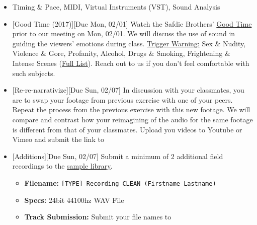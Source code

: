 \def\dMon{Mon, 02/01}
\def\dTues{Tues, 02/02}
\def\dWed{Wed, 02/03}
\def\dThur{Thur, 02/04}
\def\dFri{Fri, 02/05}
\def\dSat{Sat, 02/06}
\def\dSun{Sun, 02/07}
\placeDate


\begin{itemize}[noitemsep,topsep=0pt,leftmargin=*]
	\item {} Timing \& Pace, MIDI, Virtual Instruments (VST), Sound Analysis
	\item {}[Good Time (2017)][Due \dMon] \newline
	      Watch the Safdie Brothers' \href{https://www.netflix.com/watch/80191344?source=35}{Good Time} prior to our meeting on \dMon. We will discuss the use of sound in guiding the viewers' emotions during class.  \newline
	      \ul{Trigger Warning:} Sex \& Nudity, Violence \& Gore, Profanity, Alcohol, Drugs \& Smoking, Frightening \& Intense Scenes (\href{https://www.imdb.com/title/tt4846232/parentalguide}{Full List}). Reach out to us if you don't feel comfortable with such subjects.

	\item {}[Re-re-narrativize][Due \dSun] \newline
	      In discussion with your classmates, you are to swap your footage from previous exercise with one of your peers. Repeat the process from the previous exercise with this new footage. We will compare and contrast how your reimagining of the audio for the same footage is different from that of your classmates. Upload you videos to Youtube or Vimeo and submit the link to \discordE

	\item {}[Additions][Due \dSun] \newline
	      Submit a minimum of 2 additional field recordings to the \href{\samplelibPermURL}{sample library}.
	      \begin{itemize}
		      \item \textbf{Filename:} \texttt{[TYPE] Recording CLEAN (Firstname Lastname)}
		      \item \textbf{Specs:} 24bit 44100hz WAV File
		      \item \textbf{Track Submission:} Submit your file names to \discordS
	      \end{itemize}
\end{itemize}